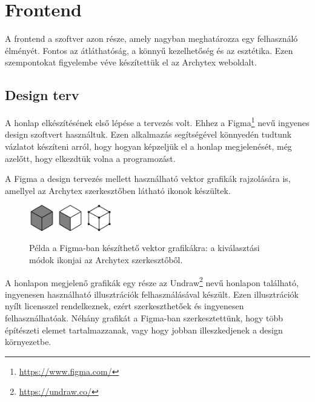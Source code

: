 \section{Frontend}

A frontend a szoftver azon része, amely nagyban meghatározza egy felhasználó élményét. Fontos az átláthatóság, a könnyű kezelhetőség és az esztétika. Ezen szempontokat figyelembe véve készítettük el az Archytex weboldalt.

\subsection{Design terv}
A honlap elkészítésének első lépése a tervezés volt. Ehhez a Figma\footnote{\url{https://www.figma.com/}} nevű ingyenes design szoftvert használtuk. Ezen alkalmazás segítségével könnyedén tudtunk vázlatot készíteni arról, hogy hogyan képzeljük el a honlap megjelenését, még azelőtt, hogy elkezdtük volna a programozást.

A Figma a design tervezés mellett használható vektor grafikák rajzolására is, amellyel az Archytex szerkesztőben látható ikonok készültek.

\begin{figure}[h]
  \centering
  \includegraphics[width=0.1\textwidth]{parts/developer-documentation/frontend/images/meshSelectMode.png}
  \includegraphics[width=0.1\textwidth]{parts/developer-documentation/frontend/images/faceSelectMode.png}
  \includegraphics[width=0.1\textwidth]{parts/developer-documentation/frontend/images/vertexSelectMode.png}
  \caption{Példa a Figma-ban készíthető vektor grafikákra: a kiválasztási módok ikonjai az Archytex szerkesztőből.}
\end{figure}

A honlapon megjelenő grafikák egy része az Undraw\footnote{\url{https://undraw.co/}} nevű honlapon található, ingyenesen használható illusztrációk felhasználásával készült. Ezen illusztrációk nyílt licensszel rendelkeznek, ezért szerkeszthetőek és ingyenesen felhasználhatóak. Néhány grafikát a Figma-ban szerkesztettünk, hogy több építészeti elemet tartalmazzanak, vagy hogy jobban illeszkedjenek a design környezetbe.

